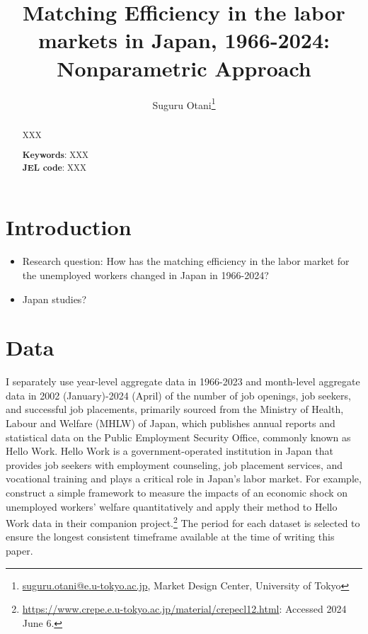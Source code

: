 \documentclass[12pt]{article}
\begin{document}
\title{Matching Efficiency in the labor markets in Japan, 1966-2024: Nonparametric Approach}
\author{Suguru Otani\thanks{\href{mailto:}{suguru.otani@e.u-tokyo.ac.jp}, Market Design Center, University of Tokyo}}
\maketitle

\begin{abstract}
\noindent
XXX

\textbf{Keywords}: XXX \\
\textbf{JEL code}: XXX
\end{abstract}

\section{Introduction}

\begin{itemize}
    \item Research question: How has the matching efficiency in the labor market for the unemployed workers changed in Japan in 1966-2024?
\end{itemize}

\begin{itemize}
    \item Japan studies? \cite{fukai2021describing}
\end{itemize}

\section{Data}

I separately use year-level aggregate data in 1966-2023 and month-level aggregate data in 2002 (January)-2024 (April) of the number of job openings, job seekers, and successful job placements, primarily sourced from the Ministry of Health, Labour and Welfare (MHLW) of Japan, which publishes annual reports and statistical data on the Public Employment Security Office, commonly known as Hello Work. 
Hello Work is a government-operated institution in Japan that provides job seekers with employment counseling, job placement services, and vocational training and plays a critical role in Japan's labor market.
For example, \cite{kawata2021first} construct a simple framework to measure the impacts of an economic shock on unemployed workers’ welfare quantitatively and apply their method to Hello Work data in their companion project.\footnote{\url{https://www.crepe.e.u-tokyo.ac.jp/material/crepecl12.html}: Accessed 2024 June 6.}
The period for each dataset is selected to ensure the longest consistent timeframe available at the time of writing this paper.
\end{document}
